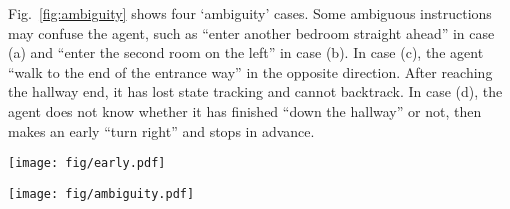 Fig.~\ref{fig:ambiguity} shows four `ambiguity' cases. 
Some ambiguous instructions may confuse the agent, such as ``enter another bedroom straight ahead'' in case (a) and ``enter the second room on the left'' in case (b). 
In case (c), the agent ``walk to the end of the entrance way'' in the opposite direction. After reaching the hallway end, it has lost state tracking and cannot backtrack. 
In case (d), the agent does not know whether it has finished ``down the hallway'' or not, then makes an early ``turn right'' and stops in advance.
\begin{figure*}[h]
\centering
\texttt{[image: fig/early.pdf]}
\vspace{-3mm}
\caption{
Failure cases of `early lost' in val unseen splits of R2R. Yellow and green circles denote the start and target locations, respectively, and the red circles represent incorrect endpoints. 
}\label{fig:early}
\end{figure*}
\begin{figure*}[h]
\centering
\texttt{[image: fig/ambiguity.pdf]}
\vspace{-3mm}
\caption{
Failure cases of `ambiguity' in val unseen splits of R2R. Yellow and green circles denote the start and target locations, respectively, and the red circles represent incorrect endpoints. 
}\label{fig:ambiguity}
\end{figure*}
